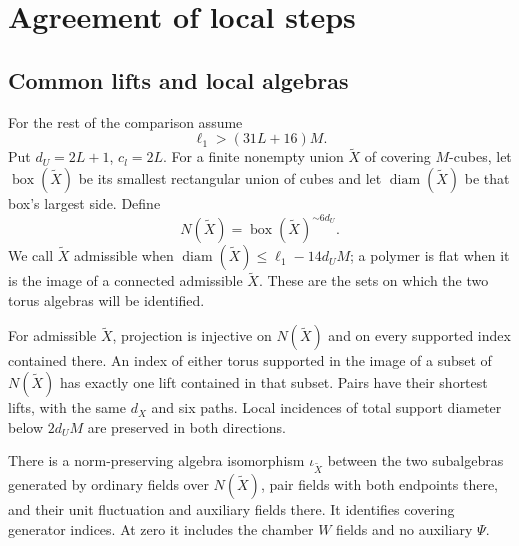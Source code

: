 \section{Agreement of local steps}\label{sec:local-comparison}

\subsection{Common lifts and local algebras}
\label{subsec:rgcov-common-lifts}

For the rest of the comparison assume
\begin{equation}\label{eq:rgcov-comparison-side}
                      \ell_1>(31L+16)M.
\end{equation}
Put $d_U=2L+1$, $c_l=2L$.
For a finite nonempty union $\widetilde X$ of covering
$M$-cubes, let $\operatorname{box}(\widetilde X)$ be
its smallest rectangular union of cubes and let
$\operatorname{diam}(\widetilde X)$ be that box's
largest side. Define
\[
 N(\widetilde X)=\operatorname{box}(\widetilde X)^{\sim6d_U}.
\]
We call $\widetilde X$ admissible
when $\operatorname{diam}(\widetilde X)
\le\ell_1-14d_UM$; a polymer is flat when it is the
image of a connected admissible $\widetilde X$.
These are the sets on which the two torus algebras
will be identified.

\begin{proposition}\label{prop:rgcov-common-lifts}
For admissible $\widetilde X$, projection is injective
on $N(\widetilde X)$ and on every supported index
contained there. An index of either torus supported
in the image of a subset of $N(\widetilde X)$ has
exactly one lift contained in that subset.
Pairs have their shortest lifts, with the same
$d_X$ and six paths.
Local incidences of total support diameter below
$2d_UM$ are preserved in both directions.

There is a norm-preserving algebra isomorphism
$\iota_{\widetilde X}$ between the two subalgebras
generated by ordinary fields over $N(\widetilde X)$,
pair fields with both endpoints there, and their
unit fluctuation and auxiliary fields there.
It identifies covering generator indices.
At zero it includes the chamber $W$ fields and
no auxiliary $\Psi$.
\end{proposition}

